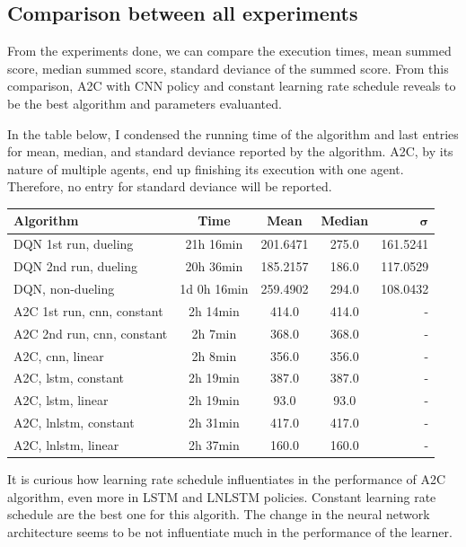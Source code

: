 \documentclass[11pt,twoside,a4paper]{article}
\begin{document}
\subsection*{Comparison between all experiments}

From the experiments done, we can compare the execution times, mean summed score,
median summed score, standard deviance of the summed score. From this comparison,
A2C with CNN policy and constant learning rate schedule reveals to be the best
algorithm and parameters evaluanted.

In the table below, I condensed the running time of the algorithm and last
entries for mean, median, and standard deviance reported by the algorithm. A2C,
by its nature of multiple agents, end up finishing its execution with one agent.
Therefore, no entry for standard deviance will be reported.

\begin{center}
  \begin{tabular}{ | l | c | c | c | r | }
    \hline
    \textbf{Algorithm} & \textbf{Time} & \textbf{Mean} & \textbf{Median} & $ \boldsymbol{\sigma} $ \\ \hline
    DQN 1st run, dueling & 21h 16min & 201.6471  & 275.0 & 161.5241 \\ \hline
    DQN 2nd run, dueling & 20h 36min & 185.2157 & 186.0  & 117.0529 \\ \hline
    DQN, non-dueling & 1d 0h 16min & 259.4902 & 294.0 & 108.0432 \\ \hline
    A2C 1st run, cnn, constant & 2h 14min & 414.0 & 414.0 & - \\ \hline
    A2C 2nd run, cnn, constant & 2h 7min & 368.0 & 368.0 & - \\ \hline
    A2C, cnn, linear & 2h 8min & 356.0 & 356.0 & - \\ \hline
    A2C, lstm, constant & 2h 19min & 387.0 & 387.0 & - \\ \hline
    A2C, lstm, linear & 2h 19min & 93.0 & 93.0 & - \\ \hline
    A2C, lnlstm, constant & 2h 31min & 417.0 & 417.0 & - \\ \hline
    A2C, lnlstm, linear & 2h 37min & 160.0 & 160.0 & - \\
    \hline
  \end{tabular}
\end{center}

It is curious how learning rate schedule influentiates in the performance of A2C
algorithm, even more in LSTM and LNLSTM policies. Constant learning rate
schedule are the best one for this algorith. The change in the neural network
architecture seems to be not influentiate much in the performance of the learner.
\end{document}
